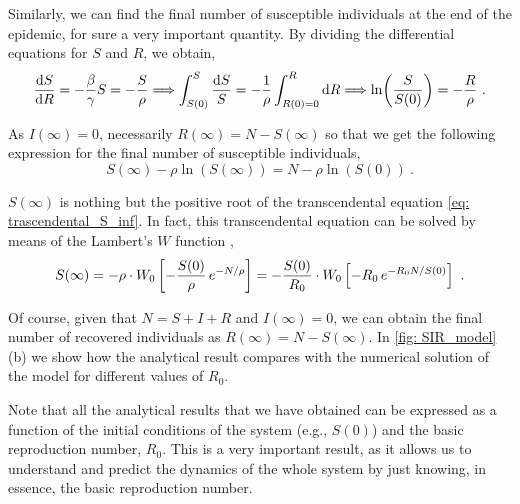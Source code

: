 Similarly, we can find the final number of susceptible individuals at the end
of
the epidemic, for sure a very important quantity. By dividing the
differential
equations for $S$ and $R$, we obtain,
\begin{equation*}
  \frac{\mathrm{d} S}{\mathrm{d} R} = -\frac{\beta}{\gamma}S=-\frac{S}{\rho}
  \Longrightarrow\int_{S(0)}^S\frac{\mathrm{d}
    S}{S}=-\frac{1}{\rho}\int_{R(0)=0}^R\mathrm{d}
  R\Longrightarrow\ln(\frac{S}{S(0)})=-\frac{R}{\rho} \ .
\end{equation*}

As $I(\infty)=0$, necessarily $R(\infty)=N-S(\infty)$ so that we get the
following expression for the final number of susceptible individuals,
\begin{equation}\label{eq: trascendental_S_inf}
  S(\infty) - \rho\ln(S(\infty))=N-\rho\ln(S(0)) \ .
\end{equation}

$S(\infty)$ is nothing but the positive root of the transcendental equation
\cref{eq: trascendental_S_inf}. In fact, this transcendental equation can be
solved by means of the Lambert's $W$ function \cite{Lethonen2016},
\begin{equation}
  S(\infty)=-\rho\cdot W_0\left[-\frac{S(0)}{\rho} \,
    e^{-N/\rho}\right]=-\frac{S(0)}{R_0}\cdot W_0\left[-R_0 \, e^{-R_0N/S(0)}\right] \
  .
\end{equation}

Of course, given that $N=S+I+R$ and $I(\infty)=0$, we can obtain the final
number of recovered individuals as $R(\infty)=N-S(\infty)$. In \cref{fig:
  SIR_model}(b) we show how the analytical result compares with the numerical
solution of the model for different values of $R_0$.

\begin{remark}
  Note that all the analytical results that we have obtained can be expressed
  as a function of the initial conditions of the system (e.g., $S(0)$) and the
  basic reproduction number, $R_0$. This is a very important result, as it
  allows us to understand and predict the dynamics of the whole system by just
  knowing, in essence, the basic reproduction number.
\end{remark}


